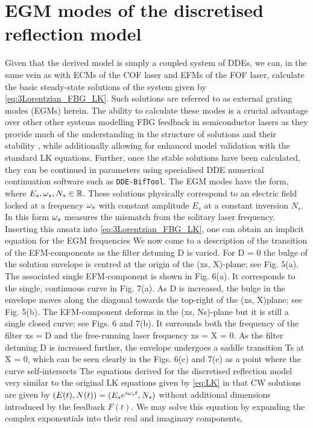 \section{EGM modes of the discretised reflection model}
\label{sec:EGM_discretised}
%
Given that the derived model is simply a coupled system of DDEs, we can, in the same vein as with ECMs of the COF laser and EFMs of the FOF laser, calculate the basic steady-state solutions of the system given by \eqref{eq:3Lorentzian_FBG_LK}. 
Such solutions are referred to as external grating modes (EGMs) herein. 
The ability to calculate these modes is a crucial advantage over other other systems modelling FBG feedback in semiconductor lasers as they provide much of the understanding in the structure of solutions and their stability \cite{rottschafer2007ecm}, 
while additionally allowing for enhanced model validation with the standard LK equations. 
Further, once the stable solutions have been calculated, they can be continued in parameters using specialised DDE numerical continuation software such as \texttt{DDE-BifTool}. 
The EGM modes have the form,
%
where $E_s, \omega_s, N_s \in \mathbb{R}$. 
These solutions physically correspond to an electric field locked at a frequency $\omega_s$ with constant amplitude $E_s$ at a constant inversion $N_s$. 
In this form $\omega_s$ measures the mismatch from the solitary laser frequency. 
Inserting this ansatz into \eqref{eq:3Lorentzian_FBG_LK}, one can obtain an implicit equation for the EGM frequencies
%
We now come to a description of the transition of the EFM-components as the filter detuning D is varied. 
For D = 0 the bulge of the solution envelope is centred at the origin of the (xs, X)-plane; see Fig. 5(a). 
The associated single EFM-component is shown in Fig. 6(a). It corresponds to the single, continuous curve in Fig. 7(a). 
As D is increased, the bulge in the envelope moves along the diagonal towards the top-right of the (xs, X)plane; see Fig. 5(b). 
The EFM-component deforms in the (xs, Ns)-plane but it is still a single closed curve; see Figs. 6 and 7(b). 
It surrounds both the frequency of the filter xs = D and the free-running laser frequency xs = X = 0. 
As the filter detuning D is increased further, the envelope undergoes a saddle transition Ts at X = 0, which can be seen clearly in the Figs. 6(c) and 7(c) as a point where the curve self-intersects
%
The equations derived for the discretised reflection model very similar to the original LK equations given by \eqref{eq:LK} in that CW solutions are given by $(E(t), N(t)) = (E_s e^{i\omega_s t}, N_s)$ without additional dimensions introduced by the feedback $F(t)$. We may solve this equation by expanding the complex exponentials into their real and imaginary components,
